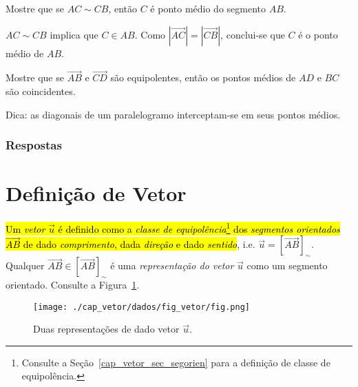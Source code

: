 \begin{exer}
  Mostre que se $AC\sim CB$, então $C$ é ponto médio do segmento $AB$.
\end{exer}
\begin{resp}
  $AC\sim CB$ implica que $C\in AB$. Como $\left|\overrightarrow{AC}\right| = \left|\overrightarrow{CB}\right|$, conclui-se que $C$ é o ponto médio de $AB$.
\end{resp}

\begin{exer}
  Mostre que se $\overrightarrow{AB}$ e $\overrightarrow{CD}$ são equipolentes, então os pontos médios de $AD$ e $BC$ são coincidentes.
\end{exer}
\begin{resp}
  Dica: as diagonais de um paralelogramo interceptam-se em seus pontos médios.
\end{resp}

\ifisbook
\subsubsection{Respostas}
\shipoutAnswer
\fi

\section{Definição de Vetor}\label{cap_vetor_sec_vetor}


\hl{Um \emph{vetor} $\vec{u}$ é definido como a \emph{classe de equipolência}\footnote{Consulte a Seção~\ref{cap_vetor_sec_segorien} para a definição de classe de equipolência.} dos \emph{segmentos orientados} $\overrightarrow{AB}$ de dado \emph{comprimento}, dada \emph{direção} e dado \emph{sentido}}, i.e. $\vec{u} = \left[\overrightarrow{AB}\right]_{\sim}$. Qualquer $\overrightarrow{AB}\in \left[\overrightarrow{AB}\right]_{\sim}$ é uma \emph{representação do vetor} $\vec{u}$ como um segmento orientado. Consulte a Figura~\ref{cap_vetor_sec_vetor:fig:vetor}.

\begin{figure}[h]
  \centering
  \texttt{[image: ./cap\_vetor/dados/fig\_vetor/fig.png]}
  \caption{Duas representações de dado vetor $\vec{u}$.}
  \label{cap_vetor_sec_vetor:fig:vetor}
\end{figure}

